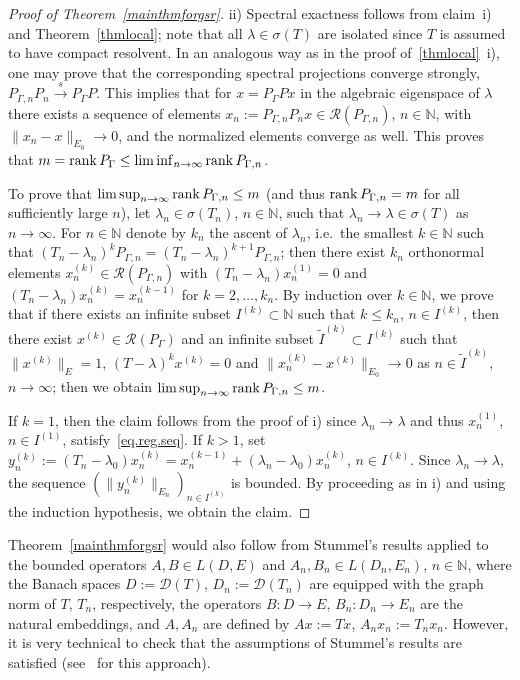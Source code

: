 \documentclass[a4paper,reqno]{amsart}
\begin{document}
{\begin{proof}[Proof of Theorem~{\rm\ref{mainthmforgsr}}]
ii)
Spectral exactness follows from claim~i) and Theorem~\ref{thmlocal}; note that all $\lambda\in\sigma(T)$ are isolated since $T$ is assumed to have compact resolvent.
 In an analogous way as in the proof of~\ref{thmlocal}~i), one may prove that the corresponding spectral projections converge strongly, $P_{\Gamma,n}P_n{\stackrel{s}{\rightarrow}} P_{\Gamma}P$. This implies that for $x=P_{\Gamma}Px$ in the algebraic eigenspace of $\lambda$ there exists a sequence of elements $x_n:=P_{\Gamma,n}P_nx\in{\mathcal R}(P_{\Gamma,n})$, $n\in{\mathbb{N}}$, with $\|x_n-x\|_{E_0}\to 0$, and the normalized elements converge as well. This proves that $m={\rm rank}\,P_{\Gamma}\leq\liminf_{n\to\infty}{\rm rank}\,P_{\Gamma,n}$. 

To prove that $\limsup_{n\to\infty}{\rm rank}\,P_{\Gamma,n}\leq m$ (and thus ${\rm rank}\,P_{\Gamma,n}=m$ for all sufficiently large $n$), let $\lambda_n\in\sigma(T_n)$, $n\in{\mathbb{N}}$, such that $\lambda_n\to\lambda\in\sigma(T)$ as $n\to\infty$.
For $n\in{\mathbb{N}}$ denote by  $k_n$ the ascent of $\lambda_n$, i.e.\ the smallest $k\in{\mathbb{N}}$ such that $(T_n-\lambda_n)^kP_{\Gamma,n}=(T_n-\lambda_n)^{k+1}P_{\Gamma,n}$;
then there exist $k_n$ orthonormal elements $x_n^{(k)}\in{\mathcal R}(P_{\Gamma,n})$ with $(T_n-\lambda_n)x_n^{(1)}=0$ and $(T_n-\lambda_n)x_n^{(k)}=x_n^{(k-1)}$ for $k=2,\dots,k_n$.
By induction over $k\in{\mathbb{N}}$, we prove that if there exists an infinite subset $I^{(k)}\subset{\mathbb{N}}$ such that $k\leq k_n$, $n\in I^{(k)}$, then there exist $x^{(k)}\in{\mathcal R}(P_{\Gamma})$ and an infinite subset $\widetilde I^{(k)}\subset I^{(k)}$ such that $\|x^{(k)}\|_E=1$, $(T-\lambda)^kx^{(k)}=0$ and  $\|x_n^{(k)}-x^{(k)}\|_{E_0}\to 0$  as $n\in \widetilde I^{(k)}$, $n\to\infty$; then we obtain $\limsup_{n\to\infty}{\rm rank}\,P_{\Gamma,n}\leq m$.

If $k=1$, then the claim follows from the proof of  i) since $\lambda_n\to\lambda$ and thus $x_n^{(1)}$, $n\in I^{(1)}$, satisfy~\eqref{eq.reg.seq}.
If $k>1$, set $y_n^{(k)}:=(T_n-\lambda_0)x_n^{(k)}=x_n^{(k-1)}+(\lambda_n-\lambda_0)x_n^{(k)}$, $n\in I^{(k)}$. 
Since $\lambda_n\to\lambda$, the sequence $(\|y_n^{(k)}\|_{E_n})_{n\in I^{(k)}}$ is bounded. By proceeding as in i) and using the induction hypothesis, we obtain the claim.
\end{proof}

\begin{rem}
Theorem~\ref{mainthmforgsr} would also follow from Stummel's results \cite[S\"atze 2.2.(1), 3.2.(8)]{stummel2} applied to the bounded operators $A,B\in L(D,E)$ and $A_n,B_n\in L(D_n,E_n)$, $n\in{\mathbb{N}}$, where the Banach spaces
$D:={\mathcal D}(T)$, $D_n:={\mathcal D}(T_n)$
are equipped with the graph norm of $T$, $T_n$, respectively,
 the operators $B:D\to E, \,B_n:D_n\to E_n$ are the natural embeddings, and $A,A_n$ are defined by
$Ax:=Tx$, $A_nx_n:=T_nx_n.$
However, it is very technical to check that the assumptions of Stummel's results are satisfied (see~\cite[Chapter~1]{boegli-phd} for this approach).
\end{rem}

}
\end{document}
